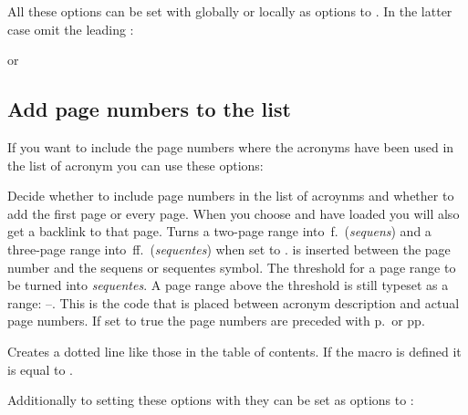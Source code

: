 \documentclass{acro-manual}
\newcommand*\latin[1]{\textit{#1}}
\begin{document}
All these options can be set with  globally or locally as options
to . In the latter case omit the leading
:
\begin{sourcecode}
  or
  \printacronyms[display=all,exclude=units]
\end{sourcecode}

\subsection{Add page numbers to the list}\label{sec:page-numbers}
If you want to include the page numbers where the acronyms have been used in
the list of acronym you can use these options:
\begin{options}
    Decide whether to include page numbers in the list of acroynms and
    whether to add the first page or every page.  When you choose
     and have  loaded you will also get a
    backlink to that page.
    Turns a two-page range into \,f.\ (\latin{sequens}) and a
    three-page range into \,ff.\ (\latin{sequentes}) when set to
    .
  \Initial{\cs*{,}}
     is inserted between the page number and the sequens or
    sequentes symbol.
    The threshold for a page range to be turned into \latin{sequentes}.  A
    page range above the threshold is still typeset as a range:
    --.
    This is the code that is placed between acronym description and actual
    page numbers.
    If set to true the page numbers are preceded with p.\ or pp.
\end{options}
\begin{commands}
    Creates a dotted line like those in the table of
    contents.  If the macro  is defined it is equal to
    .
\end{commands}
Additionally to setting these options with  they
can be set as options to :
\begin{sourcecode}
  \printacronyms[pages={display=all,seq/use=false}]
\end{sourcecode}
\end{document}
